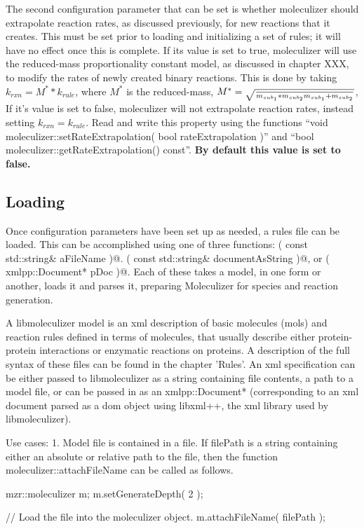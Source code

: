 The second configuration parameter that can be set is whether
moleculizer should extrapolate reaction rates, as discussed
previously, for new reactions that it creates.  This must be set prior
to loading and initializing a set of rules; it will have no effect
once this is complete.  If its value is set to true, moleculizer will
use the reduced-mass proportionality constant model, as discussed in
chapter XXX, to modify the rates of newly created binary reactions.
This is done by taking $k_{rxn} = M^* * k_{rule}$, where $M^*$ is the
reduced-mass, $M^*=\sqrt{\over{m_{sub_1} * m_{sub_2}}{m_{sub_1} +
    m_{sub_2}} }$,  If it's value is set to false, moleculizer will
not extrapolate reaction rates, instead setting $k_{rxn} = k_{rule}$.
Read and write this property using the functions ``void
moleculizer::setRateExtrapolation( bool rateExtrapolation )'' and 
``bool moleculizer::getRateExtrapolation() const''.  \bf{By default
  this value is set to false.}  

\subsection{Loading}
Once configuration parameters have been set up as needed, a rules file
can be loaded.  This can be accomplished using one of three functions:
\lstinline@attachFileName( const std::string& aFileName )@.
\lstinline@attachString( const std::string& documentAsString )@, or
\lstinline@attachDocument( xmlpp::Document* pDoc )@.  Each of these
takes a model, in one form or another, loads it and parses it,
preparing Moleculizer for species and reaction generation.

A libmoleculizer model is an xml description of basic molecules (mols) and
reaction rules defined in terms of molecules, that usually describe
either protein-protein interactions or enzymatic reactions on
proteins.  A description of the full syntax of these files can be
found in the chapter 'Rules'.  An xml specification can be either
passed to libmoleculizer as a string containing file contents, a path
to a model file, or can be passed in as an xmlpp::Document*
(corresponding to an xml document parsed as a dom object using
libxml++, the xml library used by libmoleculizer).

Use cases:
1.  Model file is contained in a file.
If filePath is a string containing either an absolute or relative path
to the file, then the function moleculizer::attachFileName can be
called as follows.  

\begin{LocalCPP}[caption=Loading a MZR file into a running
  moleculizer instance]
mzr::moleculizer m;
m.setGenerateDepth( 2 );  

// Load the file into the moleculizer object.
m.attachFileName( filePath );
\end{LocalCPP}

